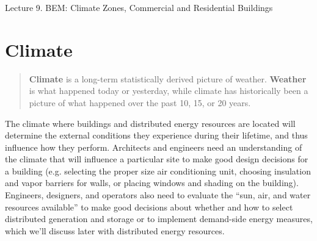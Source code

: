 \documentclass[10pt]{article}
\begin{document}
   \noindent
   \begin{center}

   \hrulefill
   
   \vspace{5pt}
   
   \vspace{0pt}
   
   {\Large \hfill  Lecture 9. BEM: Climate Zones, Commercial and Residential Buildings}
   \vspace{5pt}
   
  
   \hrulefill
   \end{center}

   {}

\section{Climate}

\begin{quote}
\textbf{Climate} is a long-term statistically derived picture of weather. \textbf{Weather} is what happened today or yesterday, while climate has historically been a picture of what happened over the past 10, 15, or 20 years. \cite{Grondzik2014-gt}
\end{quote}

The climate where buildings and distributed energy resources are located will determine the external conditions they experience during their lifetime, and thus influence how they perform. Architects and engineers need an understanding of the climate that will influence a particular site to make good design decisions for a building (e.g. selecting the proper size air conditioning unit, choosing insulation and vapor barriers for walls, or placing windows and shading on the building). Engineers, designers, and operators also need to evaluate the ``sun, air, and water resources available'' to make good decisions about whether and how to select distributed generation and storage or to implement demand-side energy measures, which we'll discuss later with distributed energy resources.
\end{document}
